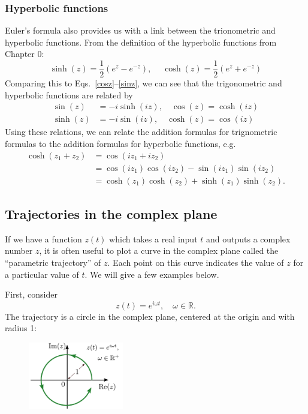 \documentclass[10pt,a4paper]{article}
\begin{document}
\subsubsection{Hyperbolic functions}
\label{hyperbolic-functions}

Euler's formula also provides us with a link between the trionometric
and hyperbolic functions. From the definition of the hyperbolic
functions from Chapter 0:
\begin{equation}
  \sinh(z) = \frac{1}{2}\left(e^{z} - e^{-z}\right), \quad\; \cosh(z) = \frac{1}{2}\left(e^{z} + e^{-z}\right)
\end{equation}
Comparing this to Eqs.~\eqref{cosz}--\eqref{sinz}, we can see that the
trigonometric and hyperbolic functions are related by
\begin{align}
  \sin(z) &= -i \sinh(iz), \quad \cos(z) = \cosh(iz) \\
  \sinh(z) &= -i \sin(iz), \quad \cosh(z) = \cos(iz)
\end{align}
Using these relations, we can relate the addition formulas for
trignometric formulas to the addition formulas for hyperbolic
functions, e.g.
\begin{align}
  \cosh(z_1+z_2) &= \cos(iz_1 + iz_2) \\
  &= \cos(iz_1)\cos(iz_2) - \sin(iz_1)\sin(iz_2) \\
  &= \cosh(z_1)\cosh(z_2) + \sinh(z_1)\sinh(z_2).
\end{align}

\subsection{Trajectories in the complex plane}
\label{trajectories-in-the-complex-plane}

If we have a function $z(t)$ which takes a real input $t$ and outputs
a complex number $z$, it is often useful to plot a curve in the
complex plane called the ``parametric trajectory'' of $z$. Each point
on this curve indicates the value of $z$ for a particular value of
$t$. We will give a few examples below.

First, consider
\begin{equation}
  z(t) = e^{i\omega t}, \quad \omega \in \mathbb{R}.
\end{equation}
The trajectory is a circle in the complex plane, centered at the
origin and with radius 1:

\begin{figure}[ht]
  \centering\includegraphics[width=0.37\textwidth]{complex_trajectory_1}
\end{figure}
\end{document}
